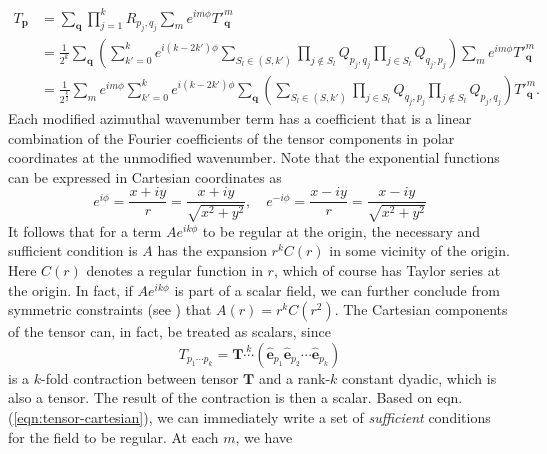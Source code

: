 \documentclass[a4paper, 11pt]{article}
\begin{document}
\begin{equation}\label{eqn:tensor-cartesian}
\begin{aligned}
    T_{\mathbf{p}} &= \sum_{\mathbf{q}} \prod_{j=1}^{k} R_{p_j,q_j} \sum_m e^{im\phi} T'^{m}_{\mathbf{q}} \\
    &= \frac{1}{2^k} \sum_\mathbf{q} \left(\sum_{k'=0}^k e^{i(k-2k')\phi} \sum_{S_l \in (S, k')} \prod_{j\notin S_l} Q_{p_j,q_j} \prod_{j\in S_l} Q_{q_j,p_j}\right) \sum_m e^{im\phi} T'^{m}_\mathbf{q} \\ 
    &= \frac{1}{2^{\frac{k}{2}}} \sum_m e^{im\phi} \sum_{k'=0}^k e^{i(k-2k')\phi} \sum_{\mathbf{q}} \left(\sum_{S_l \in (S, k')} \prod_{j\in S_l} Q_{q_j,p_j} \prod_{j\notin S_l} Q_{p_{j},q_{j}}\right) T'^m_\mathbf{q}.
\end{aligned}
\end{equation}
Each modified azimuthal wavenumber term has a coefficient that is a linear combination of the Fourier coefficients of the tensor components in polar coordinates at the unmodified wavenumber. Note that the exponential functions can be expressed in Cartesian coordinates as
\begin{equation}
    e^{i\phi} = \frac{x + iy}{r} = \frac{x + iy}{\sqrt{x^2 + y^2}},\quad 
    e^{-i\phi} = \frac{x - iy}{r} = \frac{x - iy}{\sqrt{x^2 + y^2}}
\end{equation}
It follows that for a term $A e^{ik\phi}$ to be regular at the origin, the necessary and sufficient condition is $A$ has the expansion $r^k C(r)$ in some vicinity of the origin. Here $C(r)$ denotes a regular function in $r$, which of course has Taylor series at the origin. In fact, if $A e^{ik\phi}$ is part of a scalar field, we can further conclude from symmetric constraints (see \cite{lewis_physical_1990}) that $A(r) = r^k C(r^2)$. The Cartesian components of the tensor can, in fact, be treated as scalars, since
\[
    T_{p_1\cdots p_k} = \mathbf{T} \overset{k}{\cdots} \left(\hat{\mathbf{e}}_{p_1} \hat{\mathbf{e}}_{p_2} \cdots \hat{\mathbf{e}}_{p_k}\right)
\]
is a $k$-fold contraction between tensor $\mathbf{T}$ and a rank-$k$ constant dyadic, which is also a tensor. The result of the contraction is then a scalar. Based on eqn. (\ref{eqn:tensor-cartesian}), we can immediately write a set of \textit{sufficient} conditions for the field to be regular. At each $m$, we have
\end{document}
